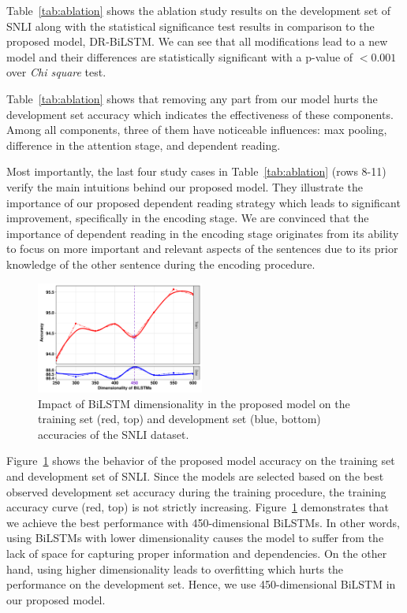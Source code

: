 \documentclass[11pt,a4paper]{article}
\begin{document}
	Table~\ref{tab:ablation} shows the ablation study results on the development set of SNLI along with the statistical significance test results in comparison to the proposed model, DR-BiLSTM. We can see that all modifications lead to a new model and their differences are statistically significant with a p-value of $<0.001$ over \emph{Chi square} test.
	
	Table~\ref{tab:ablation} shows that removing any part from our model hurts the development set accuracy which indicates the effectiveness of these components. Among all components, three of them have noticeable influences: max pooling, difference in the attention stage, and dependent reading. 
	
	Most importantly, the last four study cases in Table~\ref{tab:ablation} (rows 8-11) verify the main intuitions behind our proposed model. They illustrate the importance of our proposed dependent reading strategy which leads to significant improvement, specifically in the encoding stage. We are convinced that the importance of dependent reading in the encoding stage originates from its ability to focus on more important and relevant aspects of the sentences due to its prior knowledge of the other sentence during the encoding procedure.
	
	\begin{figure}[ht]
		\centering
		\includegraphics[width=0.49\textwidth ]{dim_study6.pdf}
		\caption{Impact of BiLSTM dimensionality in the proposed model on the training set (red, top) and development set (blue, bottom) accuracies of the SNLI dataset. \label{fig:dim:abl}}
	\end{figure}
	
	Figure~\ref{fig:dim:abl} shows the behavior of the proposed model accuracy on the training set and development set of SNLI. Since the models are selected based on the best observed development set accuracy during the training procedure, the training accuracy curve (red, top) is not strictly increasing. Figure~\ref{fig:dim:abl} demonstrates that we achieve the best performance with 450-dimensional BiLSTMs. In other words, using BiLSTMs with lower dimensionality causes the model to suffer from the lack of space for capturing proper information and dependencies. On the other hand, using higher dimensionality leads to overfitting which hurts the performance on the development set. Hence, we use 450-dimensional BiLSTM in our proposed model.
	
\end{document}
